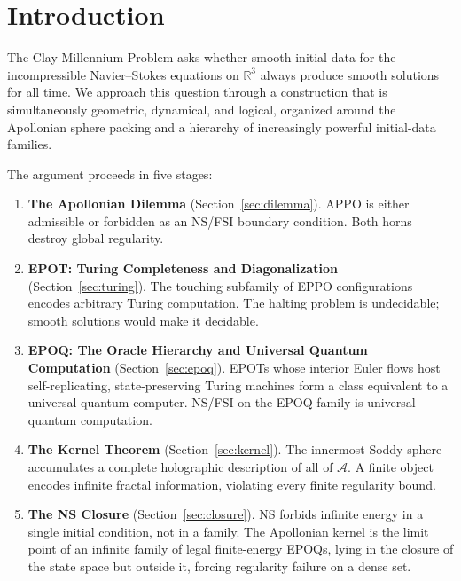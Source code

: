 \documentclass[11pt]{article}
\theoremstyle{plain}
\theoremstyle{definition}
\theoremstyle{remark}
\begin{document}
\section{Introduction}

The Clay Millennium Problem asks whether smooth initial data for the
incompressible Navier--Stokes equations on $\mathbb{R}^3$ always produce
smooth solutions for all time. We approach this question through a
construction that is simultaneously geometric, dynamical, and logical,
organized around the Apollonian sphere packing and a hierarchy of
increasingly powerful initial-data families.

The argument proceeds in five stages:

\begin{enumerate}
  \item \textbf{The Apollonian Dilemma} (Section~\ref{sec:dilemma}).
  APPO is either admissible or forbidden as an NS/FSI boundary condition.
  Both horns destroy global regularity.

  \item \textbf{EPOT: Turing Completeness and Diagonalization}
  (Section~\ref{sec:turing}). The touching subfamily of EPPO configurations
  encodes arbitrary Turing computation. The halting problem is undecidable;
  smooth solutions would make it decidable.

  \item \textbf{EPOQ: The Oracle Hierarchy and Universal Quantum Computation}
  (Section~\ref{sec:epoq}). EPOTs whose interior Euler flows host
  self-replicating, state-preserving Turing machines form a class equivalent
  to a universal quantum computer. NS/FSI on the EPOQ family is universal
  quantum computation.

  \item \textbf{The Kernel Theorem} (Section~\ref{sec:kernel}). The
  innermost Soddy sphere accumulates a complete holographic description of
  all of $\mathcal{A}$. A finite object encodes infinite fractal information,
  violating every finite regularity bound.

  \item \textbf{The NS Closure} (Section~\ref{sec:closure}). NS forbids
  infinite energy in a single initial condition, not in a family. The
  Apollonian kernel is the limit point of an infinite family of legal
  finite-energy EPOQs, lying in the closure of the state space but outside
  it, forcing regularity failure on a dense set.
\end{enumerate}
\end{document}
